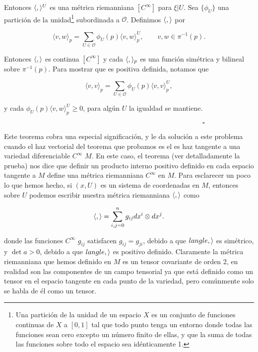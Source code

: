 \documentclass[a4paper,10pt]{article}
\numberwithin{equation}{section}
\begin{document}
Entonces $\langle \space , \space \rangle^U$ es una métrica riemanniana
$[C^\infty]$ para $\xi|U$. Sea $\{\phi_U \}$ una partición de la unidad\footnote{ Una partición 
de la unidad de un espacio $X$ es un conjunto de funciones continuas de $X$ a $[0,1]$ tal que todo punto 
tenga un entorno donde todas las funciones sean cero excepto un número finito de ellas, y que la 
suma de todas las funciones sobre todo el espacio sea idénticamente 1.} 
subordinada a $\mathcal{O}$. Definimos $\langle \space, \space \rangle$ por 

\begin{equation}
 \langle v, w \rangle_p = \sum_{U \in \mathcal{O}} \phi_U(p)\langle v, w \rangle_p^U, 
 \qquad v,w \in \pi^{-1}(p).
\end{equation}

Entonces $\langle \space, \space \rangle$ es continua $[C^\infty]$ y 
cada $\langle \space, \space \rangle_p$ es una función simétrica y 
bilineal sobre $\pi^{-1}(p)$. Para mostrar que es positiva definida, 
notamos que 

\begin{equation}
 \langle v, v \rangle_p =  \sum_{U \in \mathcal{O}} \phi_U(p)\langle v, v \rangle_p^U,
\end{equation}

y cada $\phi_U(p)\langle v, w \rangle_p^U \geq 0$, para algún $U$ la igualdad 
se mantiene.

$\hspace{12cm} \square$

Este teorema cobra una especial significación, y le da solución a este
problema cuando el haz vectorial del teorema que probamos es el es haz 
tangente a una variedad diferenciable $C^\infty$ $M$. En este caso, 
el teorema (ver detalladamente la prueba) nos dice que definir un producto 
interno positivo definido en cada espacio tangente a $M$ define una 
métrica riemanniana $C^\infty$ en $M$. Para esclarecer un poco lo que hemos hecho,
si $(x,U)$ es un sistema de coordenadas en $M$, entonces sobre $U$ podemos 
escribir nuestra métrica riemanniana $\langle \space, \space \rangle$ como 

\begin{equation}
 \langle \space , \space \rangle = \sum_{i,j = 0}^n g_{ij}dx^i \otimes dx^j.
\end{equation}

donde las funciones $C^\infty$ $g_{ij}$ satisfacen $g_{ij} = g_{ji}$, debido 
a que $langle \space , \space \rangle$ es simétrico, y $\det{a} > 0$, debido a
que $langle \space , \space \rangle$ es positivo definido. Claramente la métrica 
riemanniana que hemos definido en $M$ es un tensor covariante de orden 2, en realidad 
son las componentes de un campo tensorial ya que está definido como un tensor 
en el espacio tangente en cada punto de la variedad, pero comúnmente 
solo se habla de él como un tensor.
\end{document}
